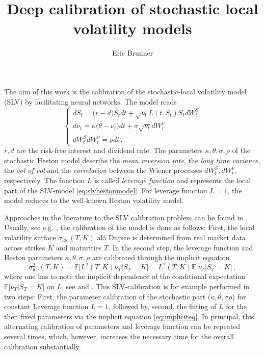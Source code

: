 \documentclass[
a4paper,     %
12pt           %
]{scrartcl}  %
\title{Deep calibration of stochastic local volatility models}
\author{Eric Brunner}
\numberwithin{equation}{section}
\begin{document}
\newcommand{\uec}[1]{\underline{#1}}

\maketitle


\noindent
The aim of this work is the calibration of the stochastic-local volatility model (SLV) by facilitating neural networks. The model reads \cite{saporito_calibration_2017}
\begin{equation}\label{eq:slvhestonmodel}
\begin{cases}
d S_t = \big( r - d \big) S_t dt + \sqrt{\nu_t} L(t, S_t)S_t dW_t^S \\
d\nu_t = \kappa \big( \theta - \nu_t \big) dt + \sigma \sqrt{\nu_t} dW_t^\nu \\
dW_t^S  dW_t^\nu = \rho dt \,.
\end{cases}
\end{equation}
$r,d$ are the risk-free interest and dividend rate. The parameters $\kappa,\theta,\sigma,\rho$ of the stochastic Heston model describe the \textit{mean reversion rate}, the \textit{long time variance}, the \textit{vol of vol} and the \textit{correlation} between the Wiener processes $dW_t^S, dW_t^\nu$, respectively. The function $L$ is called \textit{leverage function} and represents the local part of the SLV-model \eqref{eq:slvhestonmodel}. For leverage function $L=1$, the model reduces to the well-known Heston volatility model.

Approaches in the literature to the SLV calibration problem can be found in \cite{cozma_calibration_2019,guo_calibration_2019,saporito_calibration_2017}. Usually, see e.g. \cite{saporito_calibration_2017}, the calibration of the model is done as follows: First, the local volatility surface $\sigma_\text{loc}(T,K)$ alá Dupire \cite{Dupire1994PricingWA} is determined from real market data across strikes $K$ and maturities $T$. In the second step, the leverage function and Heston parameters $\kappa,\theta,\sigma,\rho$ are calibrated through the implicit equation
\begin{equation}\label{eq:impliciteq}
\sigma_\text{loc}^2 (T,K) = \mathbb{E}\big[ L^2(T,K) \nu_T \big| S_T = K\big] = L^2(T,K) \mathbb{E}\big[ \nu_T \big| S_T = K\big] \,,
\end{equation}
where one has to note the implicit dependence of the conditional expectation $\mathbb{E}\big[ \nu_T \big| S_T = K\big]$ on $L$, see \cite{gyongy_mimicking_1986} and \cite{saporito_calibration_2017}. This SLV-calibration is for example performed in two steps: First, the parameter calibration of the stochastic part ($\kappa,\theta,\sigma\rho$) for constant Leverage function $L=1$, followed by, second, the fitting of $L$ for the then fixed parameters via the implicit equation \eqref{eq:impliciteq}. In principal, this alternating calibration of parameters and leverage function can be repeated several times, which, however, increases the necessary time for the overall calibration substantially.
\end{document}
